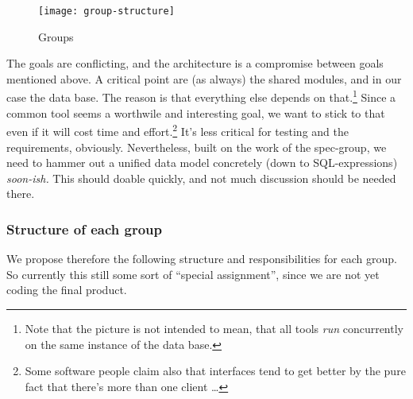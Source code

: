 \documentclass[11pt,handout]{handout}
\begin{document}
{

\begin{figure}[htbp]
  \centering
  \texttt{[image: group-structure]}  
  \caption{Groups}
  \label{fig:groups}
\end{figure}



The goals are conflicting, and the architecture is a compromise between
goals mentioned above. A critical point are (as always) the shared modules,
and in our case the data base. The reason is that everything else depends
on that.\footnote{Note that the picture is not intended to mean, that all
  tools \emph{run} concurrently on the same instance of the data base.}
Since a common tool seems a worthwile and interesting goal, we want to
stick to that even if it will cost time and effort.\footnote{Some software
  people claim also that interfaces tend to get better by the pure fact
  that there's more than one client \ldots} It's less critical for testing
and the requirements, obviously.  Nevertheless, built on the work of the
spec-group, we need to hammer out a unified data model concretely (down to
SQL-expressions) \emph{soon-ish.}  This should doable quickly, and not much
discussion should be needed there.



\subsubsection*{Structure of each group}

We propose therefore the following structure and responsibilities for each
group. So currently this still some sort of ``special assignment'', since
we are not yet coding the final product.

}
\end{document}
